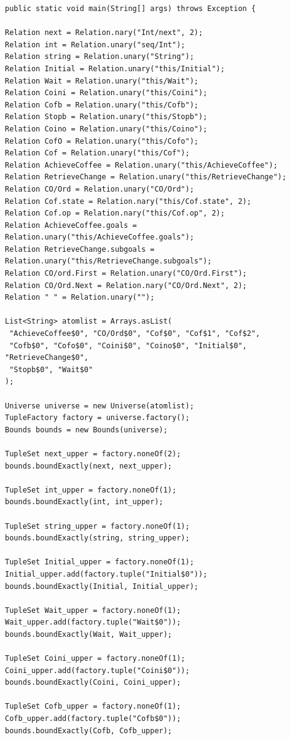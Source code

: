 \documentclass[a4paper,12pt]{report}
\begin{document}
\begin{onehalfspacing}
\begin{verbatim}
public static void main(String[] args) throws Exception {

Relation next = Relation.nary("Int/next", 2);
Relation int = Relation.unary("seq/Int");
Relation string = Relation.unary("String");
Relation Initial = Relation.unary("this/Initial");
Relation Wait = Relation.unary("this/Wait");
Relation Coini = Relation.unary("this/Coini");
Relation Cofb = Relation.unary("this/Cofb");
Relation Stopb = Relation.unary("this/Stopb");
Relation Coino = Relation.unary("this/Coino");
Relation CofO = Relation.unary("this/Cofo");
Relation Cof = Relation.unary("this/Cof");
Relation AchieveCoffee = Relation.unary("this/AchieveCoffee");
Relation RetrieveChange = Relation.unary("this/RetrieveChange");
Relation CO/Ord = Relation.unary("CO/Ord");
Relation Cof.state = Relation.nary("this/Cof.state", 2);
Relation Cof.op = Relation.nary("this/Cof.op", 2);
Relation AchieveCoffee.goals = Relation.unary("this/AchieveCoffee.goals");
Relation RetrieveChange.subgoals = Relation.unary("this/RetrieveChange.subgoals");
Relation CO/ord.First = Relation.unary("CO/Ord.First");
Relation CO/Ord.Next = Relation.nary("CO/Ord.Next", 2);
Relation " " = Relation.unary("");

List<String> atomlist = Arrays.asList(
 "AchieveCoffee$0", "CO/Ord$0", "Cof$0", "Cof$1", "Cof$2",
 "Cofb$0", "Cofo$0", "Coini$0", "Coino$0", "Initial$0", "RetrieveChange$0",
 "Stopb$0", "Wait$0"
);

Universe universe = new Universe(atomlist);
TupleFactory factory = universe.factory();
Bounds bounds = new Bounds(universe);

TupleSet next_upper = factory.noneOf(2);
bounds.boundExactly(next, next_upper);

TupleSet int_upper = factory.noneOf(1);
bounds.boundExactly(int, int_upper);

TupleSet string_upper = factory.noneOf(1);
bounds.boundExactly(string, string_upper);

TupleSet Initial_upper = factory.noneOf(1);
Initial_upper.add(factory.tuple("Initial$0"));
bounds.boundExactly(Initial, Initial_upper);

TupleSet Wait_upper = factory.noneOf(1);
Wait_upper.add(factory.tuple("Wait$0"));
bounds.boundExactly(Wait, Wait_upper);

TupleSet Coini_upper = factory.noneOf(1);
Coini_upper.add(factory.tuple("Coini$0"));
bounds.boundExactly(Coini, Coini_upper);

TupleSet Cofb_upper = factory.noneOf(1);
Cofb_upper.add(factory.tuple("Cofb$0"));
bounds.boundExactly(Cofb, Cofb_upper);


\end{verbatim}
\end{onehalfspacing}
\end{document}
